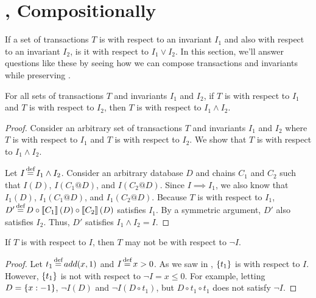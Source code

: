 \section{\iconfluence{}, Compositionally}\label{sec:composition}
If a set of \imp{} transactions $T$ is \iconfluent{} with respect to an
invariant $I_1$ and also with respect to an invariant $I_2$, is it \iconfluent
with respect to $I_1 \lor I_2$. In this section, we'll answer questions like
these by seeing how we can compose transactions and invariants while preserving
\iconfluence{}.

\begin{claim}[conjunction]\label{clm:compose-conjunction}
  For all sets of \imp{} transactions $T$ and invariants $I_1$ and $I_2$, if
  $T$ is \iconfluent{} with respect to $I_1$ and $T$ is \iconfluent{} with
  respect to $I_2$, then $T$ is \iconfluent{} with respect to $I_1 \land I_2$.
\end{claim}
\begin{proof}
  Consider an arbitrary set of \imp{} transactions $T$ and invariants $I_1$ and
  $I_2$ where $T$ is \iconfluent{} with respect to $I_1$ and $T$ is
  \iconfluent{} with respect to $I_2$. We show that $T$ is \iconfluent{} with
  respect to $I_1 \land I_2$.

  Let $I \defeq I_1 \land I_2$. Consider an arbitrary database $D$ and \imp{}
  chains $C_1$ and $C_2$ such that $I(D)$, $I(C_1@D)$, and $I(C_2@D)$. Since $I
  \implies I_1$, we also know that $I_1(D)$, $I_1(C_1@D)$, and $I_1(C_2@D)$.
  Because $T$ is \iconfluent{} with respect to $I_1$, $D' \defeq D \circ
  \denote{C_1}(D) \circ \denote{C_2}(D)$ satisfies $I_1$. By a symmetric
  argument, $D'$ also satisfies $I_2$. Thus, $D'$ satisfies $I_1 \land I_2 =
  I$.
\end{proof}

\begin{claim}[negation]\label{clm:compose-negation}
  If $T$ is \iconfluent{} with respect to $I$, then $T$ may not be
  \iconfluent{} with respect to $\lnot I$.
\end{claim}
\begin{proof}
  Let $t_1 \defeq add(x, 1)$ and $I \defeq x > 0$. As we saw in
  , $\left\{t_1\right\}$ is \iconfluent{} with respect to $I$.
  However, $\left\{t_1\right\}$ is not \iconfluent{} with respect to $\lnot I = x \leq
  0$. For example, letting $D = \left\{x:-1\right\}$, $\lnot I(D)$ and $\lnot I(D \circ
  t_1)$, but $D \circ t_1 \circ t_1$ does not satisfy $\lnot I$.
\end{proof}

